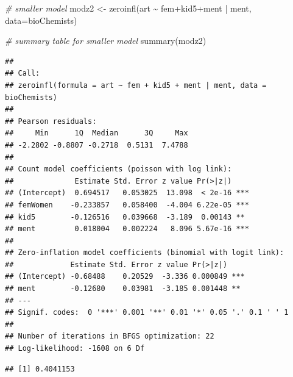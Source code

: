 \documentclass[
  ignorenonframetext,
]{beamer}
\newenvironment{Shaded}{\begin{snugshade}}{\end{snugshade}}
\newcommand{\AttributeTok}[1]{\textcolor[rgb]{0.77,0.63,0.00}{#1}}
\newcommand{\CommentTok}[1]{\textcolor[rgb]{0.56,0.35,0.01}{\textit{#1}}}
\newcommand{\ConstantTok}[1]{\textcolor[rgb]{0.00,0.00,0.00}{#1}}
\newcommand{\DecValTok}[1]{\textcolor[rgb]{0.00,0.00,0.81}{#1}}
\newcommand{\FunctionTok}[1]{\textcolor[rgb]{0.00,0.00,0.00}{#1}}
\newcommand{\NormalTok}[1]{#1}
\newcommand{\OtherTok}[1]{\textcolor[rgb]{0.56,0.35,0.01}{#1}}
\newcommand{\SpecialCharTok}[1]{\textcolor[rgb]{0.00,0.00,0.00}{#1}}
\begin{document}
\begin{frame}[fragile]{}
\protect\hypertarget{section-36}{}
\tiny

\begin{Shaded}
\begin{Highlighting}[]
\CommentTok{\# smaller model}
\NormalTok{modz2 }\OtherTok{\textless{}{-}} \FunctionTok{zeroinfl}\NormalTok{(art }\SpecialCharTok{\textasciitilde{}}\NormalTok{ fem}\SpecialCharTok{+}\NormalTok{kid5}\SpecialCharTok{+}\NormalTok{ment }\SpecialCharTok{|}\NormalTok{ ment, }\AttributeTok{data=}\NormalTok{bioChemists)}

\CommentTok{\# summary table for smaller model}
\FunctionTok{summary}\NormalTok{(modz2)}
\end{Highlighting}
\end{Shaded}

\begin{verbatim}
## 
## Call:
## zeroinfl(formula = art ~ fem + kid5 + ment | ment, data = bioChemists)
## 
## Pearson residuals:
##     Min      1Q  Median      3Q     Max 
## -2.2802 -0.8807 -0.2718  0.5131  7.4788 
## 
## Count model coefficients (poisson with log link):
##              Estimate Std. Error z value Pr(>|z|)    
## (Intercept)  0.694517   0.053025  13.098  < 2e-16 ***
## femWomen    -0.233857   0.058400  -4.004 6.22e-05 ***
## kid5        -0.126516   0.039668  -3.189  0.00143 ** 
## ment         0.018004   0.002224   8.096 5.67e-16 ***
## 
## Zero-inflation model coefficients (binomial with logit link):
##             Estimate Std. Error z value Pr(>|z|)    
## (Intercept) -0.68488    0.20529  -3.336 0.000849 ***
## ment        -0.12680    0.03981  -3.185 0.001448 ** 
## ---
## Signif. codes:  0 '***' 0.001 '**' 0.01 '*' 0.05 '.' 0.1 ' ' 1 
## 
## Number of iterations in BFGS optimization: 22 
## Log-likelihood: -1608 on 6 Df
\end{verbatim}

\begin{Shaded}
\end{Shaded}

\begin{verbatim}
## [1] 0.4041153
\end{verbatim}
\end{frame}
\end{document}
